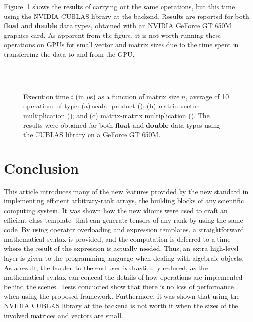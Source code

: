 \documentclass[11pt]{article}
\def\ifmonospace{\ifdim\fontdimen3\font=0pt }
\def\C++{\ifmonospace C++\else C\kern-.1667em\raise.50ex\hbox{\tiny{\textbf{+}\kern-.1em\textbf{+}}}\fi \spacefactor1000 }
\newcommand{\code}[1]{{\footnotesize\ttfamily{#1}}}
\newcommand\keywordd[1]{{\color{DarkOrchid}\footnotesize\ttfamily\textbf{#1}}}
\begin{document}
Figure~\ref{fig:cublas_dgemm} shows the results of carrying out the same operations, but this time using the NVIDIA CUBLAS library at the backend. Results are reported for both \keywordd{float} and \keywordd{double} data types, obtained with an NVIDIA GeForce GT 650M graphics card. As apparent from the figure, it is not worth running these operations on GPUs for small vector and matrix sizes due to the time spent in transferring the data to and from the GPU.
\begin{figure}
 \centering 
         \\
         \\
  \caption{\label{fig:cublas_dgemm}Execution time $t$ (in $\mu$s) as a function of matrix size $n$, average of 10 operations of type: (a)  scalar product (\code{dot}); (b) matrix-vector multiplication (\code{gemv}); and (c) matrix-matrix multiplication (\code{gemm}). The results were obtained for both \keywordd{float} and \keywordd{double} data types using the CUBLAS library on a GeForce GT 650M.}
\end{figure}



\section{Conclusion} \label{sec:conclusion}

This article introduces many of the new features provided by the new \C++ standard in implementing efficient arbitrary-rank arrays, the building blocks of any scientific computing system.
It was shown how the new idioms were used to craft an efficient \code{Array} class template, that can generate tensors of any rank by using the same code.
By using operator overloading and expression templates, a straightforward mathematical syntax is provided, and the computation is deferred to a time where the result of the expression is actually needed. Thus, an extra high-level layer is given to the \C++ programming language when dealing with algebraic objects. As a result, the burden to the end user is drastically reduced, as the mathematical syntax can conceal the details of how operations are implemented behind the scenes. Tests conducted show that there is no loss of performance when using the proposed framework. Furthermore, it was shown that using the NVIDIA CUBLAS library at the backend is not worth it when the sizes of the involved matrices and vectors are small.













\end{document}
